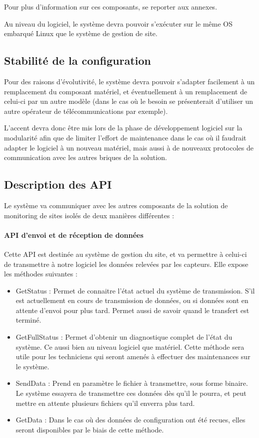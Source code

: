 Pour plus d'information sur ces composants, se reporter aux annexes.

Au niveau du logiciel, le système devra pouvoir s'exécuter sur le même OS embarqué Linux que le système de gestion de site.

\subsection{Stabilité de la configuration}

Pour des raisons d'évolutivité, le système devra pouvoir s'adapter facilement à un remplacement du composant matériel, et éventuellement à un remplacement de celui-ci par un autre modèle (dans le cas où le besoin se présenterait d'utiliser un autre opérateur de télécommunications par exemple).

L'accent devra donc être mis lors de la phase de développement logiciel sur la modularité afin que de limiter l'effort de maintenance dans le cas où il faudrait adapter le logiciel à un nouveau matériel, mais aussi à de nouveaux protocoles de communication avec les autres briques de la solution.

\subsection{Description des API}

Le système va communiquer avec les autres composants de la solution de monitoring de sites isolés de deux manières différentes :

\paragraph{API d'envoi et de réception de données}

Cette API est destinée au système de gestion du site, et va permettre à celui-ci de transmettre à notre logiciel les données relevées par les capteurs. Elle expose les méthodes suivantes :

\begin{itemize}
\item GetStatus : Permet de connaitre l'état actuel du système de transmission. S'il est actuellement en cours de transmission de données, ou si données sont en attente d'envoi pour plus tard. Permet aussi de savoir quand le transfert est terminé.
\item GetFullStatus : Permet d'obtenir un diagnostique complet de l'état du système. Ce aussi bien au niveau logiciel que matériel. Cette méthode sera utile pour les techniciens qui seront amenés à effectuer des maintenances sur le système.
\item SendData : Prend en paramètre le fichier à transmettre, sous forme binaire. Le système essayera de transmettre ces données dès qu'il le pourra, et peut mettre en attente plusieurs fichiers qu'il enverra plus tard.
\item GetData : Dans le cas où des données de configuration ont été recues, elles seront disponibles par le biais de cette méthode.
\end{itemize}

